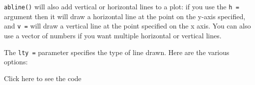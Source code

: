 \documentclass[
]{book}
\newenvironment{Shaded}{\begin{snugshade}}{\end{snugshade}}
\newcommand{\CommentTok}[1]{\textcolor[rgb]{0.56,0.35,0.01}{\textit{#1}}}
\newcommand{\DataTypeTok}[1]{\textcolor[rgb]{0.13,0.29,0.53}{#1}}
\newcommand{\DecValTok}[1]{\textcolor[rgb]{0.00,0.00,0.81}{#1}}
\newcommand{\KeywordTok}[1]{\textcolor[rgb]{0.13,0.29,0.53}{\textbf{#1}}}
\newcommand{\NormalTok}[1]{#1}
\newcommand{\OperatorTok}[1]{\textcolor[rgb]{0.81,0.36,0.00}{\textbf{#1}}}
\newcommand{\StringTok}[1]{\textcolor[rgb]{0.31,0.60,0.02}{#1}}
\begin{document}
\begin{Shaded}
\end{Shaded}

\texttt{abline()} will also add vertical or horizontal lines to a plot: if you use the \texttt{h\ =} argument then it will draw a horizontal line at the point on the y-axis specified, and \texttt{v\ =} will draw a vertical line at the point specified on the x axis. You can also use a vector of numbers if you want multiple horizontal or vertical lines.

The \texttt{lty\ =} parameter specifies the type of line drawn. Here are the various options:

Click here to see the code
\end{document}
